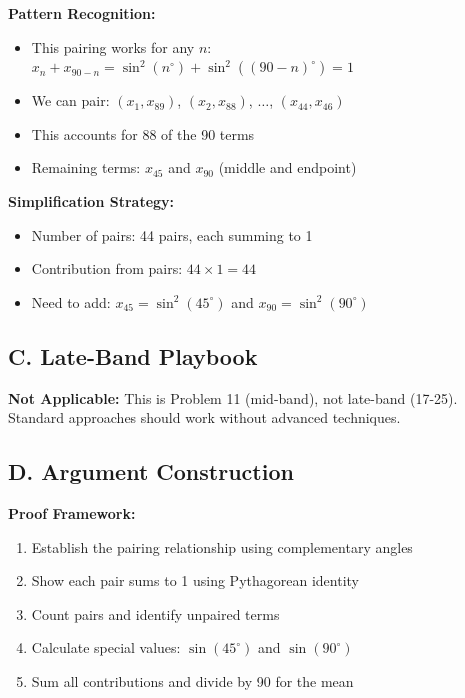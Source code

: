 \documentclass[12pt]{article}
\begin{document}
\begin{strategicbox}
\textbf{Pattern Recognition:}
\begin{itemize}
    \item This pairing works for any $n$: $x_n + x_{90-n} = \sin^2(n^{\circ}) + \sin^2((90-n)^{\circ}) = 1$
    \item We can pair: $(x_1, x_{89})$, $(x_2, x_{88})$, $\ldots$, $(x_{44}, x_{46})$
    \item This accounts for 88 of the 90 terms
    \item Remaining terms: $x_{45}$ and $x_{90}$ (middle and endpoint)
\end{itemize}

\textbf{Simplification Strategy:}
\begin{itemize}
    \item Number of pairs: 44 pairs, each summing to 1
    \item Contribution from pairs: $44 \times 1 = 44$
    \item Need to add: $x_{45} = \sin^2(45^{\circ})$ and $x_{90} = \sin^2(90^{\circ})$
\end{itemize}

\subsection*{C. Late-Band Playbook}

\textbf{Not Applicable:} This is Problem 11 (mid-band), not late-band (17-25). Standard approaches should work without advanced techniques.

\subsection*{D. Argument Construction}

\textbf{Proof Framework:}
\begin{enumerate}
    \item Establish the pairing relationship using complementary angles
    \item Show each pair sums to 1 using Pythagorean identity
    \item Count pairs and identify unpaired terms
    \item Calculate special values: $\sin(45^{\circ})$ and $\sin(90^{\circ})$
    \item Sum all contributions and divide by 90 for the mean
\end{enumerate}
\end{strategicbox}

\vspace{1em}
\end{document}
